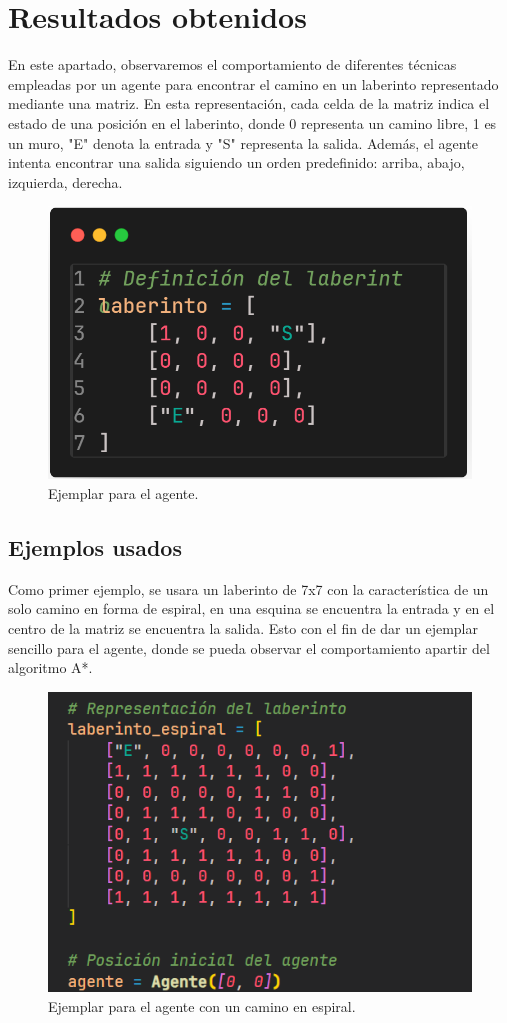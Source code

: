 \section{Resultados obtenidos}

En este apartado, observaremos el comportamiento de diferentes técnicas 
empleadas por un agente para encontrar el camino en un laberinto representado 
mediante una matriz. En esta representación, cada celda de la matriz indica
el estado de una posición en el laberinto, donde 0 representa un camino libre,
1 es un muro, "E" denota la entrada y "S" representa la salida. Además,
el agente intenta encontrar una salida siguiendo un orden predefinido: 
arriba, abajo, izquierda, derecha.

\begin{figure}[H]
    \centering
    \includegraphics[width=0.4\linewidth]{IMA/laberintoEjemplo.png} 
    \caption{Ejemplar para el agente.} 
\end{figure}

\subsection*{Ejemplos usados}
Como primer ejemplo, se usara un laberinto de 7x7 con la característica de un solo camino en forma
de espiral, en una esquina se encuentra la entrada y en el centro de la matriz se encuentra la salida.
Esto con el fin de dar un ejemplar sencillo para el agente, donde se pueda observar el comportamiento apartir
del algoritmo A*.

\begin{figure}[H]
    \centering
    \includegraphics[width=0.5\linewidth]{IMA/Laberinto1.png} 
    \caption{Ejemplar para el agente con un camino en espiral.} 
    \label{fig:ejemplo} 
\end{figure}


